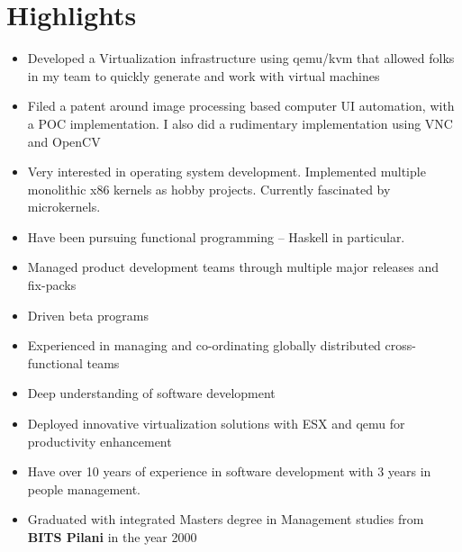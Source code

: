 \documentclass [a4paper,11pt] {article}
\begin{document}
\section*{Highlights}
\begin{itemize}

\item Developed a Virtualization infrastructure using qemu/kvm that allowed folks
in my team to quickly generate and work with virtual machines

\item Filed a patent around image processing based computer UI automation, 
with a POC implementation. I also did a rudimentary implementation using VNC and
OpenCV

\item Very interested in operating system development. Implemented multiple
monolithic x86 kernels as hobby projects. Currently fascinated by microkernels.

\item Have been pursuing functional programming – Haskell in particular.

\item Managed product development teams through multiple major releases and
fix-packs  

\item Driven beta programs

\item Experienced in managing and co-ordinating globally distributed
cross-functional teams

\item Deep understanding of software development

\item Deployed innovative virtualization solutions with ESX and qemu for
productivity enhancement

\item Have over 10 years of experience in software development with 3 years in
people management.

\item Graduated with integrated Masters degree in Management studies from {\bf BITS
Pilani} in the year 2000
\end{itemize}
\end{document}
